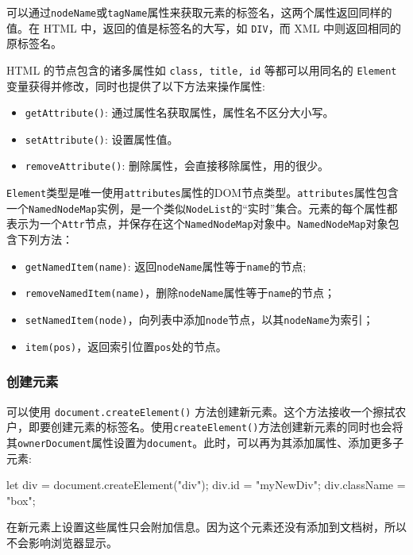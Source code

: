 可以通过\texttt{nodeName}或\texttt{tagName}属性来获取元素的标签名，这两个属性返回同样的值。在 HTML 中，返回的值是标签名的大写，如 \texttt{DIV}，而 XML 中则返回相同的原标签名。

HTML 的节点包含的诸多属性如 \texttt{class, title, id} 等都可以用同名的 \texttt{Element} 变量获得并修改，同时也提供了以下方法来操作属性:
\begin{itemize}
    \item \texttt{getAttribute()}: 通过属性名获取属性，属性名不区分大小写。
    \item \texttt{setAttribute()}: 设置属性值。
    \item \texttt{removeAttribute()}: 删除属性，会直接移除属性，用的很少。
\end{itemize}

\texttt{Element}类型是唯一使用\texttt{attributes}属性的DOM节点类型。\texttt{attributes}属性包含一个\texttt{NamedNodeMap}实例，是一个类似\texttt{NodeList}的“实时”集合。元素的每个属性都表示为一个\texttt{Attr}节点，并保存在这个\texttt{NamedNodeMap}对象中。\texttt{NamedNodeMap}对象包含下列方法：
\begin{itemize}
    \item \texttt{getNamedItem(name)}: 返回\texttt{nodeName}属性等于\texttt{name}的节点;
    \item \texttt{removeNamedItem(name)}，删除\texttt{nodeName}属性等于\texttt{name}的节点；
    \item \texttt{setNamedItem(node)}，向列表中添加\texttt{node}节点，以其\texttt{nodeName}为索引；
    \item \texttt{item(pos)}，返回索引位置\texttt{pos}处的节点。
\end{itemize}

\subsubsection*{创建元素}

可以使用 \texttt{document.createElement()}  方法创建新元素。这个方法接收一个擦拭农户，即要创建元素的标签名。使用\texttt{createElement()}方法创建新元素的同时也会将其\texttt{ownerDocument}属性设置为\texttt{document}。此时，可以再为其添加属性、添加更多子元素:

\begin{JavaScript}
let div = document.createElement("div"); 
div.id = "myNewDiv"; 
div.className = "box"; 
\end{JavaScript}

在新元素上设置这些属性只会附加信息。因为这个元素还没有添加到文档树，所以不会影响浏览器显示。

